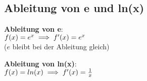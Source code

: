 \subsection{Ableitung von e und ln(x)}
\begin{multicols}{2}
\textbf{Ableitung von e}: \\
$f(x) = e^x \\
\implies f'(x) = e^x$ \\
($e$ bleibt bei der Ableitung gleich) 

\columnbreak

\textbf{Ableitung von ln(x)}: \\
$
f(x) = ln(x) \\
\implies f'(x) = \frac{1}{x}
$
\end{multicols}
